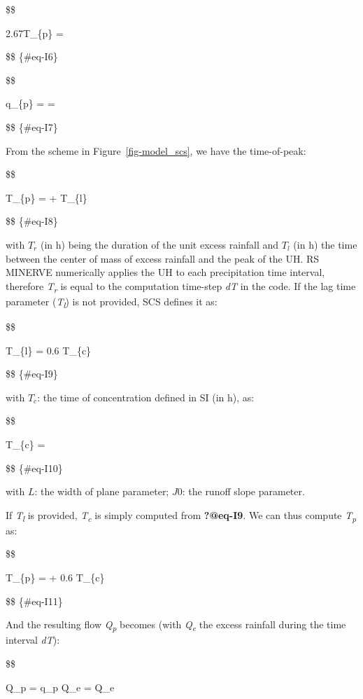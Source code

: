 \documentclass[
  letterpaper,
  DIV=11,
  numbers=noendperiod]{scrreprt}
\begin{document}
\$\$

 \cdot 2.67T\_\{p\}  = 

\$\$ \{\#eq-I6\}

\$\$

q\_\{p\} =  =
 

\$\$ \{\#eq-I7\}

From the scheme in Figure~\ref{fig-model_scs}, we have the time-of-peak:

\$\$

T\_\{p\} =  + T\_\{l\}

\$\$ \{\#eq-I8\}

with \(T_r\) (in h) being the duration of the unit excess rainfall and
\(T_l\) (in h) the time between the center of mass of excess rainfall
and the peak of the UH. RS MINERVE numerically applies the UH to each
precipitation time interval, therefore \emph{T\textsubscript{r}} is
equal to the computation time-step \emph{dT} in the code. If the lag
time parameter (\emph{T\textsubscript{l}}) is not provided, SCS defines
it as:

\$\$

T\_\{l\} = 0.6 \cdot T\_\{c\}

\$\$ \{\#eq-I9\}

with \(T_c\): the time of concentration defined in SI (in h), as:

\$\$

T\_\{c\} = 

\$\$ \{\#eq-I10\}

with \(L\): the width of plane parameter; \(J0\): the runoff slope
parameter.

If \emph{T\textsubscript{l}} is provided, \emph{T\textsubscript{c}} is
simply computed from \textbf{?@eq-I9}. We can thus compute
\emph{T\textsubscript{p}} as:

\$\$

T\_\{p\} =  + 0.6 \cdot T\_\{c\}

\$\$ \{\#eq-I11\}

And the resulting flow \emph{Q\textsubscript{p}} becomes (with
\emph{Q\textsubscript{e}} the excess rainfall during the time interval
\emph{dT}):

\$\$

Q\_p = q\_p \cdot Q\_e = 
\cdot Q\_e
\end{document}
